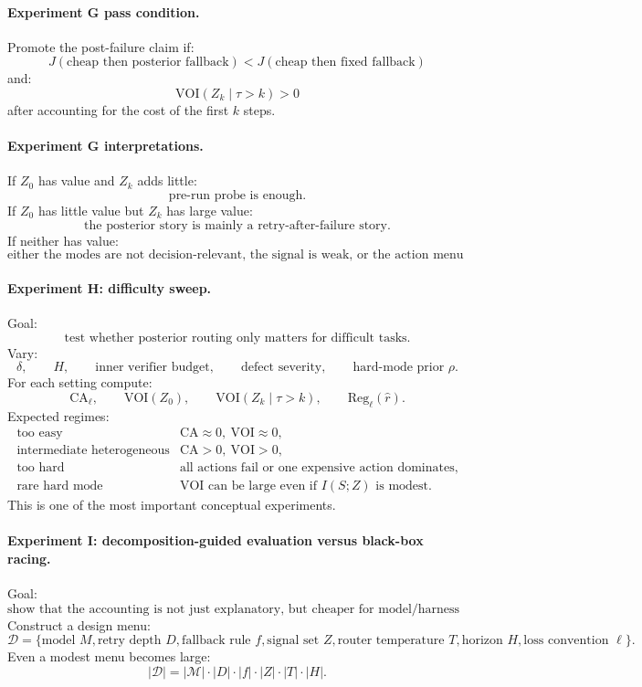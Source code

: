 \documentclass{article}
\begin{document}
\paragraph{Experiment G pass condition.}
Promote the post-failure claim if:
\[
    J(\text{cheap then posterior fallback})
    <
    J(\text{cheap then fixed fallback})
\]
and:
\[
    \mathrm{VOI}(Z_k\mid \tau>k)>0
\]
after accounting for the cost of the first \(k\) steps.

\paragraph{Experiment G interpretations.}
If \(Z_0\) has value and \(Z_k\) adds little:
\[
    \text{pre-run probe is enough.}
\]
If \(Z_0\) has little value but \(Z_k\) has large value:
\[
    \text{the posterior story is mainly a retry-after-failure story.}
\]
If neither has value:
\[
    \text{either the modes are not decision-relevant, the signal is weak, or the action menu lacks
    comparative advantage.}
\]

\paragraph{Experiment H: difficulty sweep.}
Goal:
\[
    \text{test whether posterior routing only matters for difficult tasks.}
\]
Vary:
\[
    \delta,
    \qquad
    H,
    \qquad
    \text{inner verifier budget},
    \qquad
    \text{defect severity},
    \qquad
    \text{hard-mode prior }\rho.
\]
For each setting compute:
\[
    \mathrm{CA}_{\ell},
    \qquad
    \mathrm{VOI}(Z_0),
    \qquad
    \mathrm{VOI}(Z_k\mid \tau>k),
    \qquad
    \mathrm{Reg}_{\ell}(\hat r).
\]
Expected regimes:
\[
\begin{array}{ll}
    \text{too easy} &
    \mathrm{CA}\approx 0,\ \mathrm{VOI}\approx 0,\\
    \text{intermediate heterogeneous} &
    \mathrm{CA}>0,\ \mathrm{VOI}>0,\\
    \text{too hard} &
    \text{all actions fail or one expensive action dominates},\\
    \text{rare hard mode} &
    \text{VOI can be large even if \(I(S;Z)\) is modest}.
\end{array}
\]
This is one of the most important conceptual experiments.

\paragraph{Experiment I: decomposition-guided evaluation versus black-box racing.}
Goal:
\[
    \text{show that the accounting is not just explanatory, but cheaper for model/harness selection.}
\]
Construct a design menu:
\[
\mathcal D
=
\{
\text{model }M,
\text{retry depth }D,
\text{fallback rule }f,
\text{signal set }Z,
\text{router temperature }T,
\text{horizon }H,
\text{loss convention }\ell
\}.
\]
Even a modest menu becomes large:
\[
    |\mathcal D|
    =
    |\mathcal M|\cdot|D|\cdot|f|\cdot|Z|\cdot|T|\cdot|H|.
\]
\end{document}
